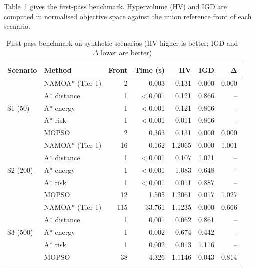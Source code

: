 \documentclass{ssnreview}
\begin{document}
Table~\ref{tab:bench} gives the first-pass benchmark. Hypervolume (HV) and IGD are
computed in normalised objective space against the union reference front of each scenario.

\begin{table}[H]
\centering\caption{First-pass benchmark on synthetic scenarios (HV higher is better; IGD
and $\Delta$ lower are better)}\label{tab:bench}\small
\begin{tabular}{l l r r r r r}
\toprule
\textbf{Scenario} & \textbf{Method} & \textbf{Front} & \textbf{Time (s)} & \textbf{HV} & \textbf{IGD} & $\boldsymbol{\Delta}$\\
\midrule
\multirow{5}{*}{S1 (50)}  & NAMOA* (Tier 1) & 2   & 0.003  & 0.131  & 0.000 & 0.000\\
                          & A* distance     & 1   & $<$0.001 & 0.121 & 0.866 & --\\
                          & A* energy       & 1   & $<$0.001 & 0.121 & 0.866 & --\\
                          & A* risk         & 1   & $<$0.001 & 0.011 & 0.866 & --\\
                          & MOPSO           & 2   & 0.363  & 0.131  & 0.000 & 0.000\\
\midrule
\multirow{5}{*}{S2 (200)} & NAMOA* (Tier 1) & 16  & 0.162  & 1.2065 & 0.000 & 1.001\\
                          & A* distance     & 1   & $<$0.001 & 0.107 & 1.021 & --\\
                          & A* energy       & 1   & $<$0.001 & 1.083 & 0.648 & --\\
                          & A* risk         & 1   & $<$0.001 & 0.011 & 0.887 & --\\
                          & MOPSO           & 12  & 1.505  & 1.2061 & 0.017 & 1.027\\
\midrule
\multirow{5}{*}{S3 (500)} & NAMOA* (Tier 1) & 115 & 33.761 & 1.1235 & 0.000 & 0.666\\
                          & A* distance     & 1   & 0.001  & 0.062  & 0.861 & --\\
                          & A* energy       & 1   & 0.002  & 0.674  & 0.442 & --\\
                          & A* risk         & 1   & 0.002  & 0.013  & 1.116 & --\\
                          & MOPSO           & 38  & 4.326  & 1.1146 & 0.043 & 0.814\\
\bottomrule
\end{tabular}
\end{table}
\end{document}
